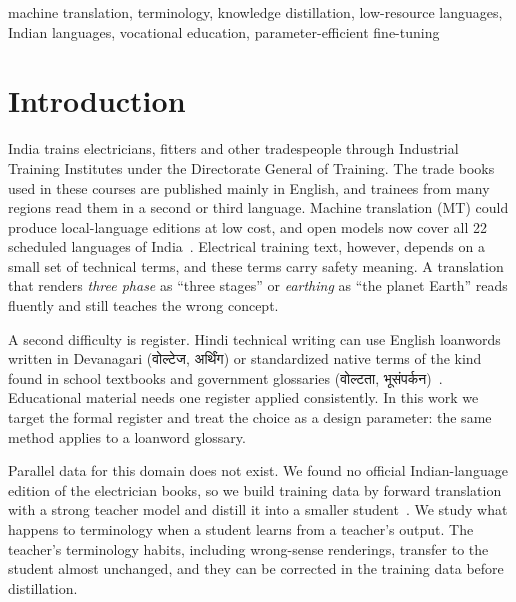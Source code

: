 \documentclass[conference]{IEEEtran}
\newcommand{\dev}[1]{{\devfont #1}}
\begin{document}
\begin{IEEEkeywords}
machine translation, terminology, knowledge distillation, low-resource languages, Indian languages, vocational education, parameter-efficient fine-tuning
\end{IEEEkeywords}

\section{Introduction}

India trains electricians, fitters and other tradespeople through Industrial Training Institutes under the Directorate General of Training. The trade books used in these courses are published mainly in English, and trainees from many regions read them in a second or third language. Machine translation (MT) could produce local-language editions at low cost, and open models now cover all 22 scheduled languages of India~\cite{gala2023indictrans2}. Electrical training text, however, depends on a small set of technical terms, and these terms carry safety meaning. A translation that renders \emph{three phase} as ``three stages'' or \emph{earthing} as ``the planet Earth'' reads fluently and still teaches the wrong concept.

A second difficulty is register. Hindi technical writing can use English loanwords written in Devanagari (\dev{वोल्टेज}, \dev{अर्थिंग}) or standardized native terms of the kind found in school textbooks and government glossaries (\dev{वोल्टता}, \dev{भूसंपर्कन})~\cite{ncert_science10,cstt}. Educational material needs one register applied consistently. In this work we target the formal register and treat the choice as a design parameter: the same method applies to a loanword glossary.

Parallel data for this domain does not exist. We found no official Indian-language edition of the electrician books, so we build training data by forward translation with a strong teacher model and distill it into a smaller student~\cite{kim2016sequence}. We study what happens to terminology when a student learns from a teacher's output. The teacher's terminology habits, including wrong-sense renderings, transfer to the student almost unchanged, and they can be corrected in the training data before distillation.
\end{document}
